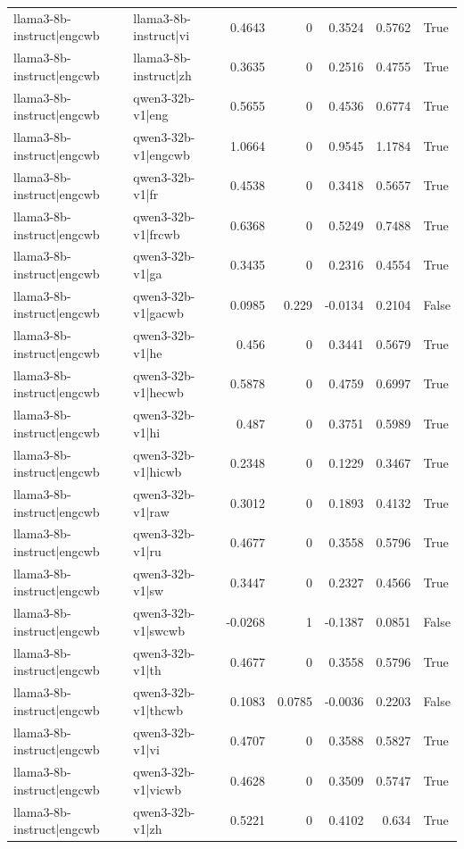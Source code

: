 \begin{table}
\begin{tabular}{l l r r r r l}
llama3-8b-instruct|engcwb & llama3-8b-instruct|vi & 0.4643 & 0 & 0.3524 & 0.5762 & True \\
llama3-8b-instruct|engcwb & llama3-8b-instruct|zh & 0.3635 & 0 & 0.2516 & 0.4755 & True \\
llama3-8b-instruct|engcwb & qwen3-32b-v1|eng & 0.5655 & 0 & 0.4536 & 0.6774 & True \\
llama3-8b-instruct|engcwb & qwen3-32b-v1|engcwb & 1.0664 & 0 & 0.9545 & 1.1784 & True \\
llama3-8b-instruct|engcwb & qwen3-32b-v1|fr & 0.4538 & 0 & 0.3418 & 0.5657 & True \\
llama3-8b-instruct|engcwb & qwen3-32b-v1|frcwb & 0.6368 & 0 & 0.5249 & 0.7488 & True \\
llama3-8b-instruct|engcwb & qwen3-32b-v1|ga & 0.3435 & 0 & 0.2316 & 0.4554 & True \\
llama3-8b-instruct|engcwb & qwen3-32b-v1|gacwb & 0.0985 & 0.229 & -0.0134 & 0.2104 & False \\
llama3-8b-instruct|engcwb & qwen3-32b-v1|he & 0.456 & 0 & 0.3441 & 0.5679 & True \\
llama3-8b-instruct|engcwb & qwen3-32b-v1|hecwb & 0.5878 & 0 & 0.4759 & 0.6997 & True \\
llama3-8b-instruct|engcwb & qwen3-32b-v1|hi & 0.487 & 0 & 0.3751 & 0.5989 & True \\
llama3-8b-instruct|engcwb & qwen3-32b-v1|hicwb & 0.2348 & 0 & 0.1229 & 0.3467 & True \\
llama3-8b-instruct|engcwb & qwen3-32b-v1|raw & 0.3012 & 0 & 0.1893 & 0.4132 & True \\
llama3-8b-instruct|engcwb & qwen3-32b-v1|ru & 0.4677 & 0 & 0.3558 & 0.5796 & True \\
llama3-8b-instruct|engcwb & qwen3-32b-v1|sw & 0.3447 & 0 & 0.2327 & 0.4566 & True \\
llama3-8b-instruct|engcwb & qwen3-32b-v1|swcwb & -0.0268 & 1 & -0.1387 & 0.0851 & False \\
llama3-8b-instruct|engcwb & qwen3-32b-v1|th & 0.4677 & 0 & 0.3558 & 0.5796 & True \\
llama3-8b-instruct|engcwb & qwen3-32b-v1|thcwb & 0.1083 & 0.0785 & -0.0036 & 0.2203 & False \\
llama3-8b-instruct|engcwb & qwen3-32b-v1|vi & 0.4707 & 0 & 0.3588 & 0.5827 & True \\
llama3-8b-instruct|engcwb & qwen3-32b-v1|vicwb & 0.4628 & 0 & 0.3509 & 0.5747 & True \\
llama3-8b-instruct|engcwb & qwen3-32b-v1|zh & 0.5221 & 0 & 0.4102 & 0.634 & True \\

\end{tabular}
\end{table}
